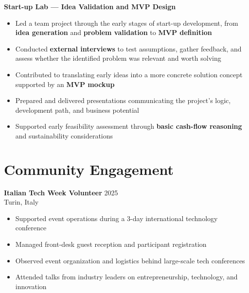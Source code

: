 \documentclass[11pt]{article}
\begin{document}
\vspace{4pt}

\textbf{Start-up Lab --- Idea Validation and MVP Design} \\[-0.8em]
\begin{itemize}
\item Led a team project through the early stages of start-up development, from \textbf{idea generation} and \textbf{problem validation} to \textbf{MVP definition}
\item Conducted \textbf{external interviews} to test assumptions, gather feedback, and assess whether the identified problem was relevant and worth solving
\item Contributed to translating early ideas into a more concrete solution concept supported by an \textbf{MVP mockup}
\item Prepared and delivered presentations communicating the project’s logic, development path, and business potential
\item Supported early feasibility assessment through \textbf{basic cash-flow reasoning} and sustainability considerations
\end{itemize}


\section*{Community Engagement}

\textbf{Italian Tech Week Volunteer} \hfill {\color{textgray}2025} \\[-0.2em]
{\color{textgray}Turin, Italy}

\begin{itemize}
\item Supported event operations during a 3-day international technology conference
\item Managed front-desk guest reception and participant registration
\item Observed event organization and logistics behind large-scale tech conferences
\item Attended talks from industry leaders on entrepreneurship, technology, and innovation
\end{itemize}

\end{document}
